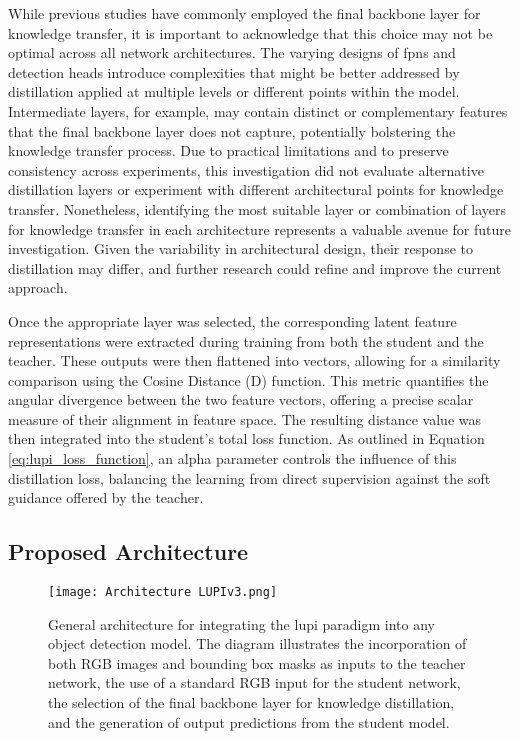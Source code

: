 While previous studies have commonly employed the final backbone layer for knowledge transfer, it is important to acknowledge that this choice may not be optimal across all network architectures. The varying designs of \glspl{fpn} and detection heads introduce complexities that might be better addressed by distillation applied at multiple levels or different points within the model. Intermediate layers, for example, may contain distinct or complementary features that the final backbone layer does not capture, potentially bolstering the knowledge transfer process. Due to practical limitations and to preserve consistency across experiments, this investigation did not evaluate alternative distillation layers or experiment with different architectural points for knowledge transfer. Nonetheless, identifying the most suitable layer or combination of layers for knowledge transfer in each architecture represents a valuable avenue for future investigation. Given the variability in architectural design, their response to distillation may differ, and further research could refine and improve the current approach.

Once the appropriate layer was selected, the corresponding latent feature representations were extracted during training from both the student and the teacher. These outputs were then flattened into vectors, allowing for a similarity comparison using the Cosine Distance (\gls{D}) function. This metric quantifies the angular divergence between the two feature vectors, offering a precise scalar measure of their alignment in feature space. The resulting distance value was then integrated into the student’s total loss function. As outlined in Equation \ref{eq:lupi_loss_function}, an \gls{alpha} parameter controls the influence of this distillation loss, balancing the learning from direct supervision against the soft guidance offered by the teacher.

\subsection{Proposed Architecture}
\label{subsec:4_architecture}

\begin{figure}[!b]
    \centering
    \texttt{[image: Architecture LUPIv3.png]}
    \caption{General architecture for integrating the \gls{lupi} paradigm into any object detection model. The diagram illustrates the incorporation of both RGB images and bounding box masks as inputs to the teacher network, the use of a standard RGB input for the student network, the selection of the final backbone layer for knowledge distillation, and the generation of output predictions from the student model.}
    \label{fig:lupi_architecture}%
\end{figure}

